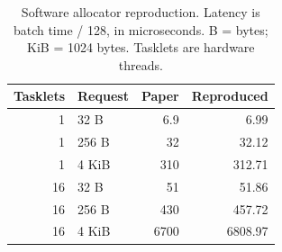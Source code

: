 \begin{table}[t]
\caption{Software allocator reproduction. Latency is batch time / 128, in microseconds. B = bytes; KiB = 1024 bytes. Tasklets are hardware threads.}\label{tab:baseline}
\centering\small
\begin{tabular}{rlrr}\toprule
Tasklets & Request & Paper & Reproduced \\ \midrule
1 & 32 B & 6.9 & 6.99 \\
1 & 256 B & 32 & 32.12 \\
1 & 4 KiB & 310 & 312.71 \\
16 & 32 B & 51 & 51.86 \\
16 & 256 B & 430 & 457.72 \\
16 & 4 KiB & 6700 & 6808.97 \\
\bottomrule\end{tabular}
\end{table}
